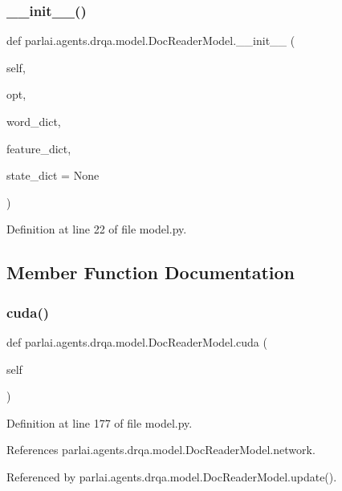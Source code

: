\subsubsection{\texorpdfstring{\+\_\+\+\_\+init\+\_\+\+\_\+()}{\_\_init\_\_()}}
{\footnotesize\ttfamily def parlai.\+agents.\+drqa.\+model.\+Doc\+Reader\+Model.\+\_\+\+\_\+init\+\_\+\+\_\+ (\begin{DoxyParamCaption}\item[{}]{self,  }\item[{}]{opt,  }\item[{}]{word\+\_\+dict,  }\item[{}]{feature\+\_\+dict,  }\item[{}]{state\+\_\+dict = {\ttfamily None} }\end{DoxyParamCaption})}



Definition at line 22 of file model.\+py.



\subsection{Member Function Documentation}
\mbox{\label{classparlai_1_1agents_1_1drqa_1_1model_1_1DocReaderModel_aaefd7c0afecedb97555c466befd2a68c}} 
\subsubsection{\texorpdfstring{cuda()}{cuda()}}
{\footnotesize\ttfamily def parlai.\+agents.\+drqa.\+model.\+Doc\+Reader\+Model.\+cuda (\begin{DoxyParamCaption}\item[{}]{self }\end{DoxyParamCaption})}



Definition at line 177 of file model.\+py.



References parlai.\+agents.\+drqa.\+model.\+Doc\+Reader\+Model.\+network.



Referenced by parlai.\+agents.\+drqa.\+model.\+Doc\+Reader\+Model.\+update().


